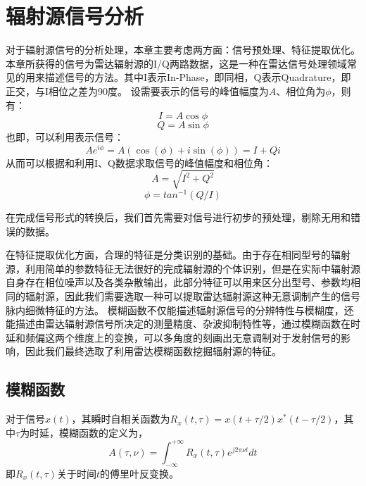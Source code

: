 \section{辐射源信号分析}
对于辐射源信号的分析处理，本章主要考虑两方面：信号预处理、特征提取优化。
本章所获得的信号为雷达辐射源的I/Q两路数据，这是一种在雷达信号处理领域常见的用来描述信号的方法。其中I表示In-Phase，即同相，Q表示Quadrature，即正交，与I相位之差为90度。
设需要表示的信号的峰值幅度为$A$、相位角为$\phi$，则有：
\begin{equation}
	I = A\cos{\phi}
	\label{equ:i}
\end{equation}
\begin{equation}
	Q = A\sin{\phi}
	\label{equ:q}
\end{equation}
也即，可以利用表示信号：
\begin{equation}
	Ae^{i\phi}=A(\cos(\phi) + i\sin(\phi))=I+Qi
	\label{equ:signal}
\end{equation}
从而可以根据和利用I、Q数据求取信号的峰值幅度和相位角：
\begin{equation}
	A=\sqrt{I^2+Q^2}
\end{equation}
\begin{equation}
	\phi=tan^{-1}(Q/I)
\end{equation}

在完成信号形式的转换后，我们首先需要对信号进行初步的预处理，剔除无用和错误的数据。


在特征提取优化方面，合理的特征是分类识别的基础。由于存在相同型号的辐射源，利用简单的参数特征无法很好的完成辐射源的个体识别，但是在实际中辐射源自身存在相位噪声以及各类杂散输出，此部分特征可以用来区分出型号、参数均相同的辐射源，因此我们需要选取一种可以提取雷达辐射源这种无意调制产生的信号脉内细微特征的方法。
模糊函数不仅能描述辐射源信号的分辨特性与模糊度，还能描述由雷达辐射源信号所决定的测量精度、杂波抑制特性等，通过模糊函数在时延和频偏这两个维度上的变换，可以多角度的刻画出无意调制对于发射信号的影响，因此我们最终选取了利用雷达模糊函数挖掘辐射源的特征。

\subsection{模糊函数}
对于信号$x(t)$，其瞬时自相关函数为$R_x(t,\tau)=x(t+\tau/2)x^{*}(t-\tau/2)$，其中$\tau$为时延，模糊函数的定义为，
\begin{equation}
A(\tau,\nu) = \int_{-\infty}^{+\infty}R_x(t,\tau)e^{j2\pi\nu t}dt
\label{equ:defineaf}
\end{equation}
即$R_x(t,\tau)$关于时间$t$的傅里叶反变换。

